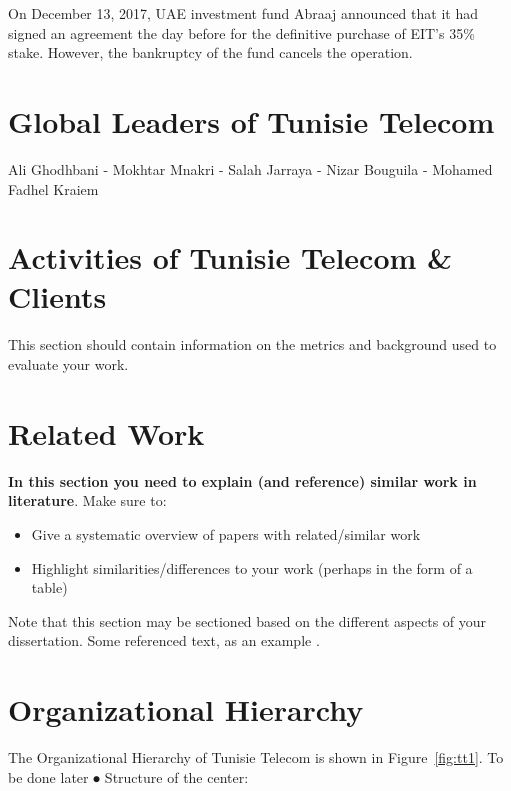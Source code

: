 On December 13, 2017, UAE investment fund Abraaj announced that it had signed an agreement the day before for the definitive purchase of EIT's 35\% stake. However, the bankruptcy of the fund cancels the operation.





{}

\section{Global Leaders of Tunisie Telecom}%
Ali Ghodhbani - Mokhtar Mnakri - Salah Jarraya - Nizar Bouguila - Mohamed Fadhel Kraiem



\section{Activities of Tunisie Telecom \& Clients}%
This section should contain information on the metrics and background used to evaluate your work.
\section{Related Work}
\textbf{In this section you need to explain (and reference) similar work in literature}.  Make sure to:

\begin{itemize}
 \item Give a systematic overview of papers with related/similar work
 \item Highlight similarities/differences to your work (perhaps in the form of a table)
\end{itemize}

Note that this section may be sectioned based on the different aspects of your dissertation.  Some referenced text, as an example \citep{Arrighi2003, WithersMartinez2012, Ebejer2016}.

\section{Organizational Hierarchy}
The Organizational Hierarchy of Tunisie Telecom is shown in Figure~\ref{fig:tt1}.
	To be done later
⦁ Structure of the center:

